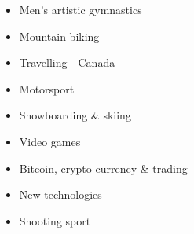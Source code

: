 


\fontsize{9pt}{1em}\bodyfontlight\upshape\color{text}
{
    \begin{multicols}{3}
        \begin{itemize}
            \item Men's artistic gymnastics
            \item Mountain biking
            \item Travelling - Canada
            \item Motorsport
            \item Snowboarding \& skiing
            \item Video games
            \item Bitcoin, crypto currency \& trading
            \item New technologies
            \item Shooting sport
        \end{itemize}
    \end{multicols}
}
